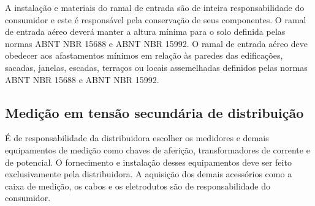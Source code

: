 
A instalação e materiais do ramal de entrada são de inteira responsabilidade do consumidor e este é responsável pela conservação de seus componentes. O ramal de entrada aéreo deverá manter a altura mínima para o solo definida pelas normas ABNT NBR 15688 e ABNT NBR 15992. 
O ramal de entrada aéreo deve obedecer aos afastamentos mínimos em relação às paredes das edificações, sacadas, janelas, escadas, terraços ou locais assemelhadas definidos pelas normas ABNT NBR 15688 e ABNT NBR 15992.

\subsection{Medição em tensão secundária de distribuição} 

É de responsabilidade da distribuidora escolher os medidores e demais equipamentos de medição como chaves de aferição, transformadores de corrente e de potencial. O fornecimento e instalação desses equipamentos deve ser feito exclusivamente pela distribuidora. A aquisição dos demais acessórios como a caixa de medição, os cabos e os eletrodutos são de responsabilidade do consumidor.

\begin{comment}
A caixa de medição deve estar a uma altura mínima de 1.5m do chão. A medição será feita no secundário do Transformador por meio de três TCs de 200/5 de acordo com o quadro 1 da norma DIS-NOR-036. O TC deverá seguir as seguintes especificações:

\begin{itemize}
    \item Modelo: 4NC5122-2DE21;
    \item Fabricante: Siemens;
    \item Tamanho: 1;
    \item Monofásico;
    \item Classe de exatidão: 0.5;
    \item Relação de transformação (RTC) de 200/5.
\end{itemize}
\end{comment}

